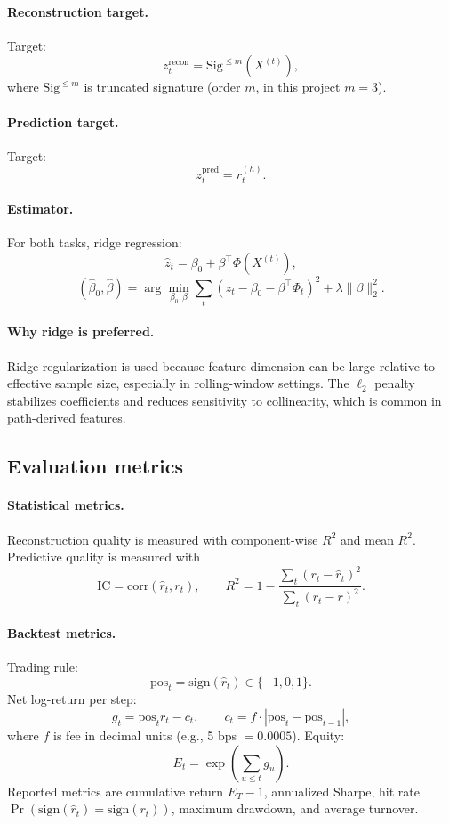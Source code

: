 \documentclass[11pt]{article}
\begin{document}
\paragraph{Reconstruction target.}
Target:
\[
z_t^{\mathrm{recon}} = \mathrm{Sig}^{\le m}(X^{(t)}),
\]
where \(\mathrm{Sig}^{\le m}\) is truncated signature (order \(m\), in this project \(m=3\)).

\paragraph{Prediction target.}
Target:
\[
z_t^{\mathrm{pred}} = r_t^{(h)}.
\]

\paragraph{Estimator.}
For both tasks, ridge regression:
\[
\hat z_t = \beta_0 + \beta^\top \Phi(X^{(t)}),
\]
\[
(\hat\beta_0,\hat\beta) = \arg\min_{\beta_0,\beta}
\sum_t \left(z_t-\beta_0-\beta^\top\Phi_t\right)^2 + \lambda\|\beta\|_2^2.
\]
\paragraph{Why ridge is preferred.}
Ridge regularization is used because feature dimension can be large relative to effective sample size, especially in rolling-window settings. The \(\ell_2\) penalty stabilizes coefficients and reduces sensitivity to collinearity, which is common in path-derived features.

\subsection{Evaluation metrics}
\paragraph{Statistical metrics.}
Reconstruction quality is measured with component-wise \(R^2\) and mean \(R^2\). Predictive quality is measured with
\[
\mathrm{IC}=\mathrm{corr}(\hat r_t,r_t),\qquad
R^2 = 1 - \frac{\sum_t (r_t-\hat r_t)^2}{\sum_t(r_t-\bar r)^2}.
\]

\paragraph{Backtest metrics.}
Trading rule:
\[
\text{pos}_t = \mathrm{sign}(\hat r_t)\in\{-1,0,1\}.
\]
Net log-return per step:
\[
g_t = \text{pos}_t r_t - c_t,\qquad
c_t = f\cdot |\text{pos}_t-\text{pos}_{t-1}|,
\]
where \(f\) is fee in decimal units (e.g., 5 bps \(=0.0005\)).
Equity:
\[
E_t=\exp\left(\sum_{u\le t}g_u\right).
\]
Reported metrics are cumulative return \(E_T-1\), annualized Sharpe, hit rate \(\Pr(\mathrm{sign}(\hat r_t)=\mathrm{sign}(r_t))\), maximum drawdown, and average turnover.
\end{document}
